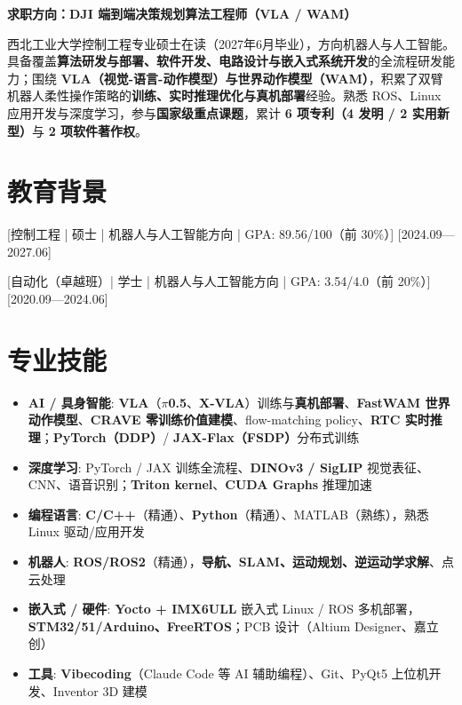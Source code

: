 \documentclass{resume-photo}
\newcommand{\hl}[1]{\textbf{\textcolor{hlred}{#1}}}
\begin{document}

\ResumeTitle

\begin{center}
  {\heiti{}\hl{求职方向：DJI 端到端决策规划算法工程师（VLA / WAM）}}
\end{center}

\noindent 西北工业大学控制工程专业硕士在读（2027年6月毕业），方向机器人与人工智能。具备覆盖\hl{算法研发与部署、软件开发、电路设计与嵌入式系统开发}的全流程研发能力；围绕 \hl{VLA（视觉-语言-动作模型）与世界动作模型（WAM）}，积累了双臂机器人柔性操作策略的\hl{训练、实时推理优化与真机部署}经验。熟悉 ROS、Linux 应用开发与深度学习，参与\hl{国家级重点课题}，累计 \hl{6 项专利（4 发明 / 2 实用新型）}与 \hl{2 项软件著作权}。

\section{教育背景}
\ResumeItem{西北工业大学\hl{（985）}}
[\textnormal{控制工程 | 硕士 | 机器人与人工智能方向 | GPA: 89.56/100（前 30\%）}]
[2024.09—2027.06]

\ResumeItem{郑州大学\hl{（211）}}
[\textnormal{自动化（卓越班）| 学士 | 机器人与人工智能方向 | GPA: 3.54/4.0（前 20\%）}]
[2020.09—2024.06]

\section{专业技能}
\begin{itemize}
  \item \textbf{AI / 具身智能}: \hl{VLA}（\hl{\(\pi\)0.5}、\hl{X-VLA}）训练与\hl{真机部署}、\hl{FastWAM 世界动作模型}、\hl{CRAVE 零训练价值建模}、flow-matching policy、\hl{RTC 实时推理}；\hl{PyTorch（DDP）}/ \hl{JAX-Flax（FSDP）}分布式训练
  \item \textbf{深度学习}: PyTorch / JAX 训练全流程、\hl{DINOv3 / SigLIP} 视觉表征、CNN、语音识别；\hl{Triton kernel}、\hl{CUDA Graphs} 推理加速
  \item \textbf{编程语言}: \hl{C/C++}（精通）、\hl{Python}（精通）、MATLAB（熟练），熟悉 Linux 驱动/应用开发
  \item \textbf{机器人}: \hl{ROS/ROS2}（精通），\hl{导航、SLAM、运动规划、逆运动学求解}、点云处理
  \item \textbf{嵌入式 / 硬件}: \hl{Yocto + IMX6ULL} 嵌入式 Linux / ROS 多机部署，\hl{STM32/51/Arduino、FreeRTOS}；PCB 设计（Altium Designer、嘉立创）
  \item \textbf{工具}: \hl{Vibecoding}（Claude Code 等 AI 辅助编程）、Git、PyQt5 上位机开发、Inventor 3D 建模
\end{itemize}
\end{document}
